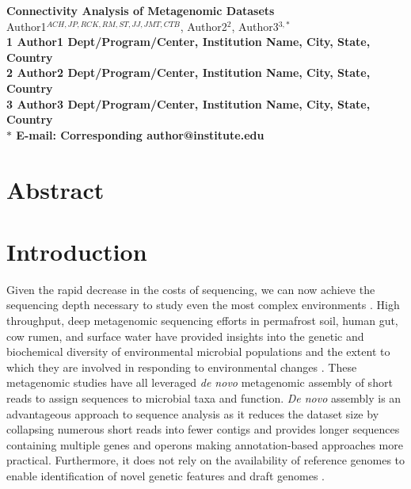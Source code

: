 \documentclass[10pt]{article}
\date{}
\begin{document}
\begin{flushleft}
{\Large
\textbf{Connectivity Analysis of Metagenomic Datasets}
}
\\
Author1$^{ACH, JP, RCK, RM, ST, JJ, JMT, CTB}$, 
Author2$^{2}$, 
Author3$^{3,\ast}$
\\
\bf{1} Author1 Dept/Program/Center, Institution Name, City, State, Country
\\
\bf{2} Author2 Dept/Program/Center, Institution Name, City, State, Country
\\
\bf{3} Author3 Dept/Program/Center, Institution Name, City, State, Country
\\
$\ast$ E-mail: Corresponding author@institute.edu
\end{flushleft}

\section*{Abstract}


\section*{Introduction}
Given the rapid decrease in the costs of sequencing, we can now achieve the sequencing depth necessary to study even the most complex environments \cite{Hess:2011p686,Qin:2010p189}.  High throughput, deep metagenomic sequencing efforts in permafrost soil, human gut, cow rumen, and surface water have provided insights into the genetic and biochemical diversity of environmental microbial populations \cite{Hess:2011p686,Iverson:2012p1281,Qin:2010p189} and the extent to which they are involved in responding to environmental changes \cite{Mackelprang:2011p1087}. These metagenomic studies have all leveraged \emph{de novo} metagenomic assembly of short reads to assign sequences to microbial taxa and function.  \emph{De novo} assembly is an advantageous approach to sequence analysis as it reduces the dataset size by collapsing numerous short reads into fewer contigs and provides longer sequences containing multiple genes and operons \cite{Miller:2010p226,Pop:2009p798} making annotation-based approaches more practical.  Furthermore, it does not rely on the availability of reference genomes to enable identification of novel genetic features and draft genomes \cite{Hess:2011p686,Iverson:2012p1281}.
\end{document}
